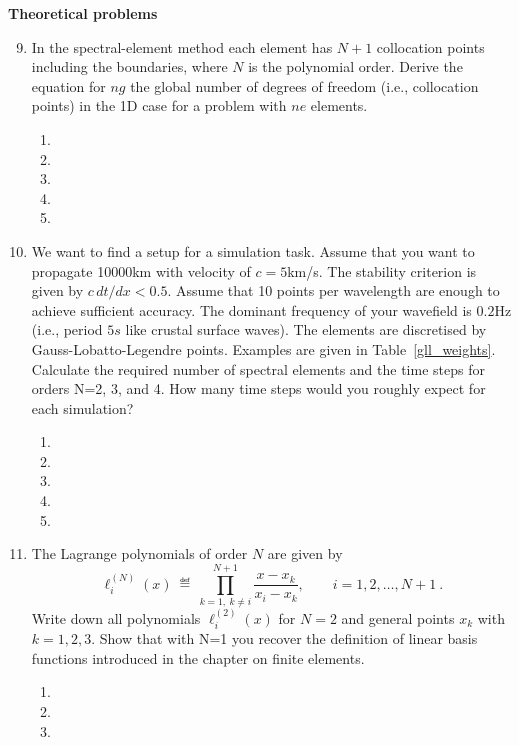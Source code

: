 {\bf Theoretical problems}
\begin{enumerate}
\setcounter{enumi}{8}
\item
In the spectral-element method each element has $N+1$ collocation points including the boundaries, where $N$ is the polynomial order. Derive the equation for $ng$ the global number of degrees of freedom (i.e., collocation points) in the 1D case for a problem with $ne$ elements. 
\begin{enumerate}
\item[]
\item[]
\item[] 
\item[]
\item[] 
\end{enumerate} 
\item
We want to find a setup for a simulation task.  Assume that you want to propagate 10000km with velocity of $c=5$km/s. The stability criterion is given by $c \, dt/dx < 0.5$. Assume that 10 points per wavelength are enough to achieve sufficient accuracy. The dominant frequency of your wavefield is $0.2$Hz (i.e., period $5s$ like crustal surface waves). The elements are discretised by Gauss-Lobatto-Legendre points.  Examples  are given in Table~\ref{gll_weights}. Calculate the required number of spectral elements and the time steps for orders N=2, 3, and 4. How many time steps would you roughly expect for each simulation? 
\begin{enumerate}
\item[]
\item[]
\item[] 
\item[]
\item[] 
\end{enumerate}
\item
The Lagrange polynomials of order $N$ are given by 
\begin{equation}
\ell_i^{(N)} (x) \ \eqdef \ \prod_{k = 1, \ k \neq i}^{N+1} \frac{x - x_k}{x_i-x_k}, \qquad   i = 1, 2, \dotsc , N + 1 \ .
\nonumber
\end{equation}
Write down all polynomials $\ell_i^{(2)} (x)$ for $N=2$ and general points $x_k$ with $k=1,2,3$. 
Show that with N=1 you recover the definition of linear basis functions introduced in the chapter on finite elements.
\begin{enumerate}
\item[]
\item[]
\item[] 

\end{enumerate}
\end{enumerate}

